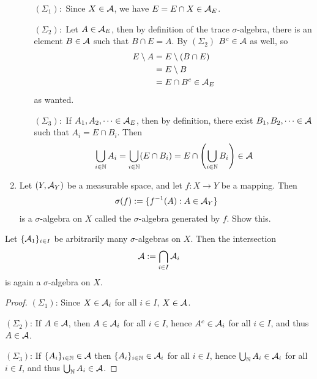 \documentclass[../../textbook.tex]{subfiles}
\begin{document}
\begin{example}
\begin{enumerate}
\begin{itemize}
    \item[$(\Sigma_1):$] Since $X\in \mathcal{A}$, we have $E=E\cap X\in \mathcal{A}_E$.
    \item[$(\Sigma_2):$] Let $A \in \mathcal{A}_E$, then by definition of the trace $\sigma$-algebra, there is an element $B\in \mathcal{A}$ such that $B\cap E=A$. By $(\Sigma_2)$ $B^c\in \mathcal{A}$ as well, so
    \begin{align*}
        E \setminus A &= E \setminus (B \cap E) \\
        &= E \setminus B \\
        &= E \cap B^c \in \mathcal{A}_E
    \end{align*}
    as wanted.
    \item[$(\Sigma_3):$] If $A_1, A_2, \dots \in \mathcal{A}_E$, then by definition, there exist $B_1, B_2, \dots \in \mathcal{A}$ such that $A_i = E \cap B_i$. Then
    \begin{align*}
        \bigcup_{i\in \mathbb{N}} A_i = \bigcup_{i\in \mathbb{N}} (E \cap B_i) = E \cap \left( \bigcup_{i\in \mathbb{N}} B_i \right) \in \mathcal{A}
    \end{align*}
\end{itemize}
\item Let $(Y, \mathcal{A}_Y)$ be a measurable space, and let $f:X \to Y$ be a mapping. Then
\begin{align*}
    \sigma(f) := \{ f^{-1}(A) : A\in \mathcal{A}_Y \}
\end{align*}
is a $\sigma$-algebra on $X$ called the $\sigma$-algebra generated by $f$. Show this.
\end{enumerate}
\end{example}

\begin{theorem}\label{thm: intersection of sigma-algebras is a sigma-algebra}
Let $\{\mathcal{A}_1\}_{i\in I}$ be arbitrarily many $\sigma$-algebras on $X$. Then the intersection
\begin{align*}
    \mathcal{A}:=\bigcap_{i\in I} \mathcal{A}_i
\end{align*}
is again a $\sigma$-algebra on $X$.
\end{theorem}
\begin{proof}
$(\Sigma_1)$: Since $X\in \mathcal{A}_i$ for all $i\in I$, $X\in \mathcal{A}$.

$(\Sigma_2)$: If $A\in \mathcal{A}$, then $A\in \mathcal{A}_i$ for all $i\in I$, hence $A^c\in \mathcal{A}_i$ for all $i\in I$, and thus $A\in \mathcal{A}$.

$(\Sigma_3)$: If $\{A_i\}_{i\in \mathbb{N}} \in \mathcal{A}$ then $\{A_i\}_{i\in \mathbb{N}}\in \mathcal{A}_i$ for all $i\in I$, hence $\bigcup_{\mathbb{N}}A_i\in \mathcal{A}_i$ for all $i\in I$, and thus $\bigcup_{\mathbb{N}}A_i\in \mathcal{A}$.
\end{proof}
\end{document}

